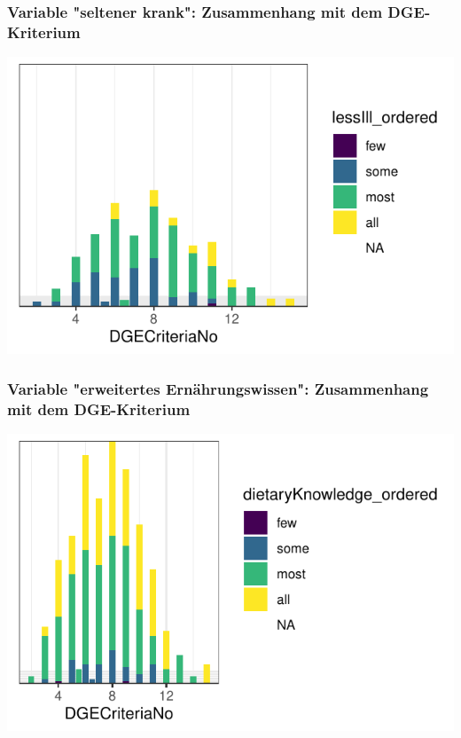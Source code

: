 \begin{frame}[fragile]
\begin{itemize}
\begin{frame}[fragile]
\frametitle{Variable "seltener krank": Zusammenhang mit dem DGE-Kriterium}
\begin{knitrout}\footnotesize
{}\color{fgcolor}

{\centering \includegraphics[width=\maxwidth]{figure/beamer-lessIllDGEplot-1} 

}



\end{knitrout}
\end{frame}

\begin{frame}[fragile]
\frametitle{Variable "erweitertes Ernährungswissen": Zusammenhang mit dem DGE-Kriterium}
\begin{knitrout}\footnotesize
{}\color{fgcolor}

{\centering \includegraphics[width=\maxwidth]{figure/beamer-dietaryDGEplot-1} 

}
\end{knitrout}
\end{frame}
\end{itemize}
\end{frame}
